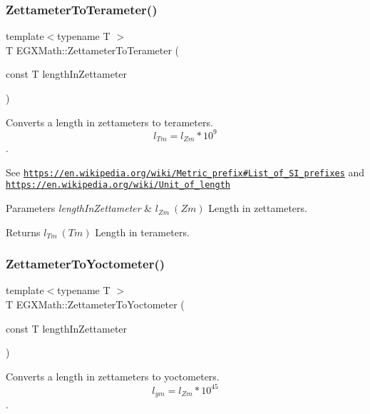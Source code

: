 \subsubsection{\texorpdfstring{Zettameter\+To\+Terameter()}{ZettameterToTerameter()}}
{\footnotesize\ttfamily template$<$typename T $>$ \\
T E\+G\+X\+Math\+::\+Zettameter\+To\+Terameter (\begin{DoxyParamCaption}\item[{const T}]{length\+In\+Zettameter }\end{DoxyParamCaption})}



Converts a length in zettameters to terameters. \[ l_{Tm}=l_{Zm} * 10^{9} \]. 

See \href{https://en.wikipedia.org/wiki/Metric_prefix#List_of_SI_prefixes}{\tt https\+://en.\+wikipedia.\+org/wiki/\+Metric\+\_\+prefix\#\+List\+\_\+of\+\_\+\+S\+I\+\_\+prefixes} and \href{https://en.wikipedia.org/wiki/Unit_of_length}{\tt https\+://en.\+wikipedia.\+org/wiki/\+Unit\+\_\+of\+\_\+length} 
\begin{DoxyParams}{Parameters}
{\em length\+In\+Zettameter} & $ l_{Zm}\ (Zm)$ Length in zettameters. \\
\hline
\end{DoxyParams}
\begin{DoxyReturn}{Returns}
$ l_{Tm}\ (Tm)$ Length in terameters. 
\end{DoxyReturn}
\mbox{\label{group___e_g_x_math-_conversions-_length_conversions-_zettameter-_s_i_ga027661828604c5467325eb50e084d96d}} 
\subsubsection{\texorpdfstring{Zettameter\+To\+Yoctometer()}{ZettameterToYoctometer()}}
{\footnotesize\ttfamily template$<$typename T $>$ \\
T E\+G\+X\+Math\+::\+Zettameter\+To\+Yoctometer (\begin{DoxyParamCaption}\item[{const T}]{length\+In\+Zettameter }\end{DoxyParamCaption})}



Converts a length in zettameters to yoctometers. \[ l_{ym}=l_{Zm} * 10^{45} \]. 

